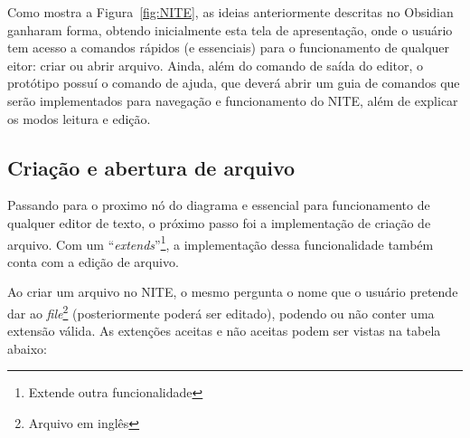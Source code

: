 Como mostra a Figura~\ref{fig:NITE}, as ideias anteriormente descritas no Obsidian ganharam forma, obtendo inicialmente esta tela de apresentação,
onde o usuário tem acesso a comandos rápidos (e essenciais) para o funcionamento de qualquer eitor: criar ou abrir arquivo.
Ainda, além do comando de saída do editor, o protótipo possuí o comando de ajuda, que deverá abrir um guia de comandos que serão
implementados para navegação e funcionamento do NITE, além de explicar os modos leitura e edição.

\subsection{Criação e abertura de arquivo}

Passando para o proximo nó do diagrama e essencial para funcionamento de qualquer editor de texto, o próximo passo foi a implementação
de criação de arquivo. Com um ``\textit{extends}''\footnote{Extende outra funcionalidade}, a implementação dessa funcionalidade
também conta com a edição de arquivo.

Ao criar um arquivo no NITE, o mesmo pergunta o nome que o usuário pretende dar ao \textit{file}\footnote{Arquivo em inglês} (posteriormente poderá ser editado),
podendo ou não conter uma extensão válida. As extenções aceitas e não aceitas podem ser vistas na tabela abaixo:

